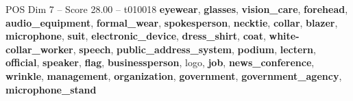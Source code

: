 \begin{textsample}{POS Dim 7 – Score 28.00 – t010018}  \label{ex:f7_pos_008}
\textbf{eyewear}, \textbf{glasses}, \textbf{vision\_care}, \textbf{forehead}, \textbf{audio\_equipment}, \textbf{formal\_wear}, \textbf{spokesperson}, \textbf{necktie}, \textbf{collar}, \textbf{blazer}, \textbf{microphone}, \textbf{suit}, \textbf{electronic\_device}, \textbf{dress\_shirt}, \textbf{coat}, \textbf{white-collar\_worker}, \textbf{speech}, \textbf{public\_address\_system}, \textbf{podium}, \textbf{lectern}, \textbf{official}, \textbf{speaker}, \textbf{flag}, \textbf{businessperson}, logo, \textbf{job}, \textbf{news\_conference}, \textbf{wrinkle}, \textbf{management}, \textbf{organization}, \textbf{government}, \textbf{government\_agency}, \textbf{microphone\_stand}

\end{textsample}
